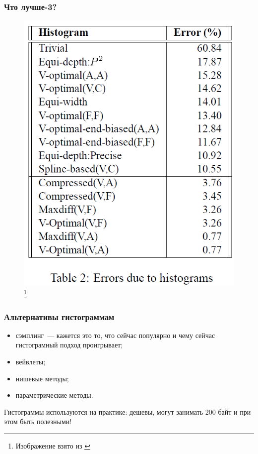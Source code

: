 \documentclass{beamer}
\begin{document}
\begin{frame}
\frametitle{Что лучше-3?}

\begin{figure}[htb]
\includegraphics[width=\textwidth,height=0.80\textheight,keepaspectratio]{test-3.png} 
\footnote{\tiny{Изображение взято из \cite{Poosala1996}}}
\end{figure}

\end{frame}

\begin{frame}
	\frametitle{Альтернативы гистограммам}
	
	\begin{itemize}
		\setlength\itemsep{1em}
		\item сэмплинг~--- кажется это то, что сейчас популярно и чему сейчас гистограмный подход проигрывает;
		\item вейвлеты;
		\item нишевые методы;
		\item параметрические методы.
	\end{itemize}
	
	Гистограммы используются на практике: дешевы, могут занимать 200 \alert{байт} \cite{Ioannidis1995} и при этом быть полезными!
	
\end{frame}
\end{document}

